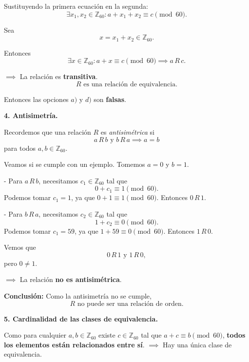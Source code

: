 \documentclass[a4paper,12pt]{article}
\begin{document}
\begin{ejercicioExamen}[title=Ejercicio 2]

Sustituyendo la primera ecuación en la segunda:
\[
\exists x_1, x_2 \in \mathbb{Z}_{60} : a + x_1 + x_2 \equiv c \pmod{60}.
\]

Sea
\[
x = x_1 + x_2 \in \mathbb{Z}_{60}.
\]

Entonces
\[
\exists x \in \mathbb{Z}_{60} : a + x \equiv c \pmod{60} \implies a \, R \, c.
\]

\(\implies\) La relación es \textbf{transitiva}.
\[
R \text{ es una relación de equivalencia.}
\]

Entonces las opciones $a)$ y $d)$ son \textbf{falsas}.

\medskip

\medskip
\textbf{4. Antisimetría.}  

Recordemos que una relación \(R\) es \emph{antisimétrica} si
\[
a \, R \, b \text{ y } b \, R \, a \implies a = b
\]
para todos \(a,b \in \mathbb{Z}_{60}\).

\medskip
Veamos si se cumple con un ejemplo. Tomemos \(a = 0\) y \(b = 1\).  

\vspace{0.5em}

- Para \(a \, R \, b\), necesitamos \(c_1 \in \mathbb{Z}_{60}\) tal que
\[
0 + c_1 \equiv 1 \pmod{60}.
\]  
Podemos tomar \(c_1 = 1\), ya que \(0 + 1 \equiv 1 \pmod{60}\). Entonces \(0 \, R \, 1\).

\vspace{0.5em}

- Para \(b \, R \, a\), necesitamos \(c_2 \in \mathbb{Z}_{60}\) tal que
\[
1 + c_2 \equiv 0 \pmod{60}.
\]  
Podemos tomar \(c_1 = 59\), ya que \(1 + 59 \equiv 0 \pmod{60}\). Entonces \(1 \, R \, 0\).  

\medskip
Vemos que
\[
0 \, R \, 1 \text{ y } 1 \, R \, 0,
\]
pero \(0 \neq 1\).  

\medskip
\(\implies\) La relación \textbf{no es antisimétrica}.

\medskip
\textbf{Conclusión:}  
Como la antisimetría no se cumple,
\[
R \text{ no puede ser una relación de orden.}
\]

\textbf{5. Cardinalidad de las clases de equivalencia.}

Como para cualquier \(a,b \in \mathbb{Z}_{60}\) existe \(c \in \mathbb{Z}_{60}\) tal que \(a + c \equiv b \pmod{60}\), \textbf{todos los elementos están relacionados entre sí}.  
\(\implies\) Hay una única clase de equivalencia.

\end{ejercicioExamen}
\end{document}

